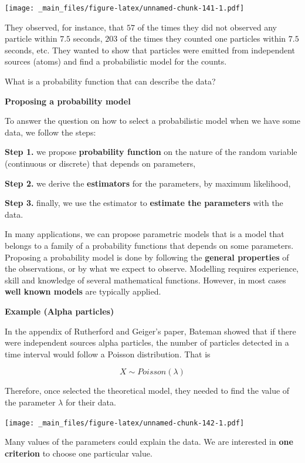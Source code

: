 \documentclass[
]{book}
\begin{document}
\texttt{[image: \_main\_files/figure-latex/unnamed-chunk-141-1.pdf]}

They observed, for instance, that \(57\) of the times they did not observed any particle within \(7.5\) seconds, \(203\) of the times they counted one particles within \(7.5\) seconds, etc. They wanted to show that particles were emitted from independent sources (atoms) and find a probabilistic model for the counts.

What is a probability function that can describe the data?

\textbf{Proposing a probability model}

To answer the question on how to select a probabilistic model when we have some data, we follow the steps:

\textbf{Step 1.} we propose \textbf{probability function} on the nature of the random variable (continuous or discrete) that depends on parameters,

\textbf{Step 2.} we derive the \textbf{estimators} for the parameters, by maximum likelihood,

\textbf{Step 3.} finally, we use the estimator to \textbf{estimate the parameters} with the data.

In many applications, we can propose parametric models that is a model that belongs to a family of a probability functions that depends on some parameters. Proposing a probability model is done by following the \textbf{general properties} of the observations, or by what we expect to observe. Modelling requires experience, skill and knowledge of several mathematical functions. However, in most cases \textbf{well known models} are typically applied.

\textbf{Example (Alpha particles)}

In the appendix of Rutherford and Geiger's paper, Bateman showed that if there were independent sources alpha particles, the number of particles detected in a time interval would follow a Poisson distribution. That is

\[X \sim Poisson (\lambda)\]

Therefore, once selected the theoretical model, they needed to find the value of the parameter \(\lambda\) for their data.

\texttt{[image: \_main\_files/figure-latex/unnamed-chunk-142-1.pdf]}

Many values of the parameters could explain the data. We are interested in \textbf{one criterion} to choose one particular value.
\end{document}
